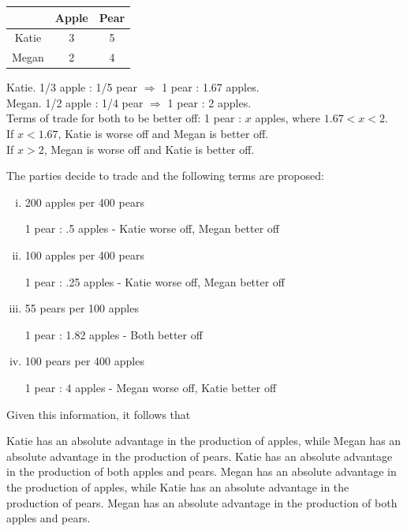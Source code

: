 \documentclass[addpoints,11pt]{exam}
\theoremstyle{definition}
\begin{document}
\begin{questions}
\begin{table}[H]
\begin{tabular}{ c|c|c}
		   & Apple & Pear \\
		\hline
		Katie & 3 & 5 \\
		Megan & 2 & 4 \\
	\end{tabular}
	\label{MC8}
\end{table}

\begin{solution}
	Katie. 1/3 apple : 1/5 pear $\Rightarrow$ 1 pear : 1.67 apples.\\
	Megan. 1/2 apple : 1/4 pear $\Rightarrow$ 1 pear : 2 apples. \\
	Terms of trade for both to be better off: 1 pear : $x$ apples, where $1.67 < x < 2$. \\
	If $x<1.67$, Katie is worse off and Megan is better off. \\
	If $x>2$, Megan is worse off and Katie is better off.\\
\end{solution}

The parties decide to trade and the following terms are proposed:

\begin{enumerate}[i.]
	\item 200 apples per 400 pears \begin{solution}1 pear : .5 apples - Katie worse off, Megan better off \end{solution}
	\item 100 apples per 400 pears \begin{solution}1 pear : .25 apples - Katie worse off, Megan better off \end{solution}
	\item 55 pears per 100 apples \begin{solution}1 pear : 1.82 apples - Both better off \end{solution}
	\item 100 pears per 400 apples \begin{solution}1 pear : 4 apples - Megan worse off, Katie better off \end{solution}
\end{enumerate}


\question \label{q12} Given this information, it follows that 
	
	\begin{choices}
		\choice Katie has an absolute advantage in the production of apples, while Megan has an absolute advantage in the production of pears.
		\choice Katie has an absolute advantage in the production of both apples and pears.
		\choice Megan has an absolute advantage in the production of apples, while Katie has an absolute advantage in the production of pears.
		\CorrectChoice Megan has an absolute advantage in the production of both apples and pears.
	\end{choices}
	

\end{questions}
\end{document}

